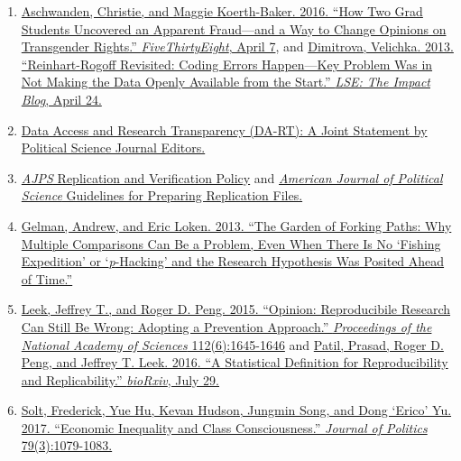 \documentclass[]{article}
\providecommand{\tightlist}{%
  \setlength{\itemsep}{0pt}\setlength{\parskip}{0pt}}
\begin{document}
\begin{enumerate}
\def\labelenumi{\arabic{enumi}.}
\tightlist
\item
  \href{http://fivethirtyeight.com/features/how-two-grad-students-uncovered-michael-lacour-fraud-and-a-way-to-change-opinions-on-transgender-rights/}{Aschwanden,
  Christie, and Maggie Koerth-Baker. 2016. ``How Two Grad Students
  Uncovered an Apparent Fraud---and a Way to Change Opinions on
  Transgender Rights.'' \emph{FiveThirtyEight}, April 7}, and
  \href{http://blogs.lse.ac.uk/impactofsocialsciences/2013/04/24/reinhart-rogoff-revisited-why-we-need-open-data-in-economics/}{Dimitrova,
  Velichka. 2013. ``Reinhart-Rogoff Revisited: Coding Errors
  Happen---Key Problem Was in Not Making the Data Openly Available from
  the Start.'' \emph{LSE: The Impact Blog}, April 24.}
\item
  \href{http://journals.cambridge.org/action/displayAbstract?fromPage=online\&aid=9911378\&fulltextType=LT\&fileId=S2049847015000448}{Data
  Access and Research Transparency (DA-RT): A Joint Statement by
  Political Science Journal Editors.}
\item
  \href{https://ajps.org/ajps-replication-policy/}{\emph{AJPS}
  Replication and Verification Policy} and
  \href{https://ajpsblogging.files.wordpress.com/2015/03/ajps-guide-for-replic-materials-1-0.pdf}{\emph{American
  Journal of Political Science} Guidelines for Preparing Replication
  Files.}
\item
  \href{http://www.stat.columbia.edu/~gelman/research/unpublished/p_hacking.pdf}{Gelman,
  Andrew, and Eric Loken. 2013. ``The Garden of Forking Paths: Why
  Multiple Comparisons Can Be a Problem, Even When There Is No `Fishing
  Expedition' or `\emph{p}-Hacking' and the Research Hypothesis Was
  Posited Ahead of Time.''}
\item
  \href{http://www.pnas.org.proxy.lib.uiowa.edu/content/112/6/1645}{Leek,
  Jeffrey T., and Roger D. Peng. 2015. ``Opinion: Reproducibile Research
  Can Still Be Wrong: Adopting a Prevention Approach.''
  \emph{Proceedings of the National Academy of Sciences}
  112(6):1645-1646} and
  \href{http://biorxiv.org/content/biorxiv/early/2016/07/29/066803.full.pdf}{Patil,
  Prasad, Roger D. Peng, and Jeffrey T. Leek. 2016. ``A Statistical
  Definition for Reproducibility and Replicability.'' \emph{bioRxiv},
  July 29.}
\item
  \href{https://www-journals-uchicago-edu.proxy.lib.uiowa.edu/doi/pdfplus/10.1086/690971}{Solt,
  Frederick, Yue Hu, Kevan Hudson, Jungmin Song, and Dong `Erico' Yu.
  2017. ``Economic Inequality and Class Consciousness.'' \emph{Journal
  of Politics} 79(3):1079-1083.}
\end{enumerate}
\end{document}
